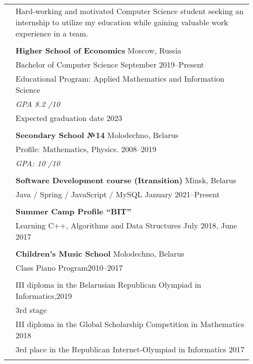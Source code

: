 \documentclass[letterpaper, 11pt]{article}
\begin{document}
\begin{longtable}{p{1.3in}p{4.8in}}


\nohyphens{\color{OliveGreen}{Objective}}
& Hard-working and motivated Computer Science student seeking an internship to utilize my
education while gaining valuable work experience in a team. \\
& \\


\color{OliveGreen}{Education} 
& \textbf{Higher School of Economics} \hfill Moscow, Russia \\ 
& Bachelor of Computer Science \hfill September 2019--Present \\
& Educational Program: Applied Mathematics and Information Science\\
& {\it GPA 8.2 \slash 10}\\
& Expected graduation date 2023\\
& \\

& \textbf{Secondary School №14} \hfill Molodechno, Belarus \\
& Profile: Mathematics, Physics. \hfill 2008--2019\\
& {\it GPA: 10 \slash 10}\\
& \\



{\color{OliveGreen}{Additional}}
& \textbf{Software Development course (Itransition)} \hfill Minsk, Belarus\\
{\color{OliveGreen}{Education}} 
& Java / Spring / JavaScript / MySQL \hfill January 2021--Present\\
& \\

& \textbf{Summer Camp Profile “BIT”} \\
& Learning C++, Algorithms and Data Structures \hfill July 2018, June 2017 \\
& \\

& \textbf{Children’s Music School} \hfill Molodechno, Belarus\\
& Class Piano Program\hfill 2010--2017\\
& \\


{\color{OliveGreen}{Aware and}} 
& III diploma in the Belarusian Republican Olympiad in Informatics,\hfill 2019\\
{\color{OliveGreen}{achievements}} 
& 3rd stage \\
& III diploma in the Global Scholarship Competition in Mathematics \hfill 2018\\
& 3rd place in the Republican Internet-Olympiad in Informatics  \hfill 2017\\
& \\


\end{longtable}
\end{document}

